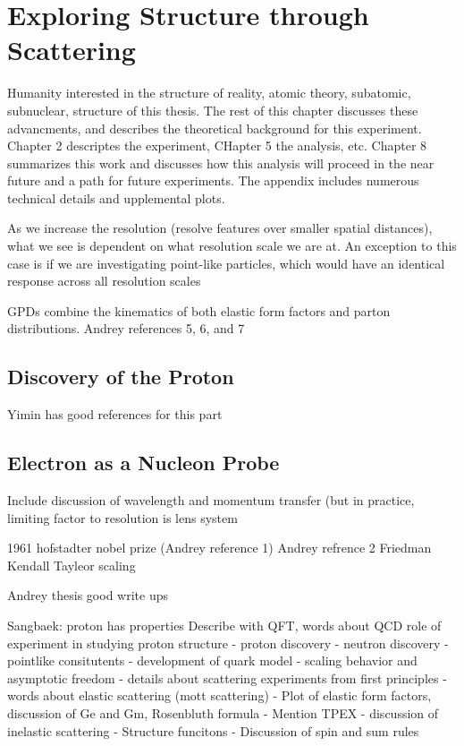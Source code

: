 \section{Exploring Structure through Scattering}\label{ch1:sec1:background}

Humanity interested in the structure of reality, atomic theory, subatomic, subnuclear, structure of this thesis.  The rest of this chapter discusses these advancments, and describes the theoretical background for this experiment. Chapter 2 descriptes the experiment, CHapter 5 the analysis, etc. Chapter 8 summarizes this work and discusses how this analysis will proceed in the near future and a path for future experiments. The appendix includes numerous technical details and upplemental plots.

As we increase the resolution (resolve features over smaller spatial distances), what we see is dependent on what resolution scale we are at. An exception to this case is if we are investigating point-like particles, which would have an identical response across all resolution scales

GPDs combine the kinematics of both elastic form factors and parton distributions. Andrey references 5, 6, and 7

\subsection{Discovery of the Proton}
Yimin has good references for this part
\subsection{Electron as a Nucleon Probe}

Include discussion of wavelength and momentum transfer (but in practice, limiting factor to resolution is lens system %

1961 hofstadter nobel prize (Andrey reference 1)
Andrey refrence 2 Friedman Kendall Tayleor scaling

Andrey thesis good write ups

Sangbaek:
proton has properties
Describe with QFT, words about QCD
role of experiment in studying proton structure
- proton discovery
- neutron discovery
- pointlike consitutents
- development of quark model
- scaling behavior and asymptotic freedom
- details about scattering experiments from first principles
- words about elastic scattering (mott scattering)
- Plot of elastic form factors, discussion of Ge and Gm, Rosenbluth formula
- Mention TPEX
- discussion of inelastic scattering
- Structure funcitons
- Discussion of spin and sum rules

